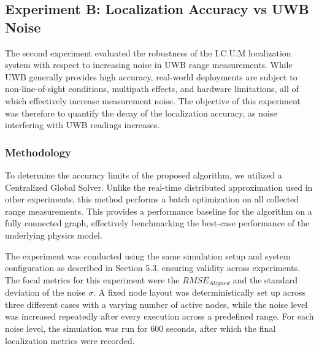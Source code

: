 \subsection{Experiment B: Localization Accuracy vs UWB Noise}
\label{sec:exp_b}
\noindent The second experiment evaluated the robustness of the I.C.U.M localization system with respect to increasing noise in UWB range measurements. While UWB generally provides high accuracy, real-world deployments are subject to non-line-of-sight conditions, multipath effects, and hardware limitations, all of which effectively increase measurement noise. The objective of this experiment was therefore to quantify the decay of the localization accuracy, as noise interfering with UWB readings increases.

\subsubsection{Methodology}
\noindent To determine the accuracy limits of the proposed algorithm, we utilized a Centralized Global Solver. Unlike the real-time distributed approximation used in other experiments, this method performs a batch optimization on all collected range measurements. This provides a performance baseline for the algorithm on a fully connected graph, effectively benchmarking the best-case performance of the underlying physics model.

\noindent The experiment was conducted using the same simulation setup and system configuration as described in Section 5.3, ensuring validity across experiments. The focal metrics for this experiment were the $RMSE_{Aligned}$ and the standard deviation of the noise $\sigma$. A fixed node layout was deterministically set up across three different cases with a varying number of active nodes, while the noise level was increased repeatedly after every execution across a predefined range. For each noise level, the simulation was run for 600 seconds, after which the final localization metrics were recorded.

